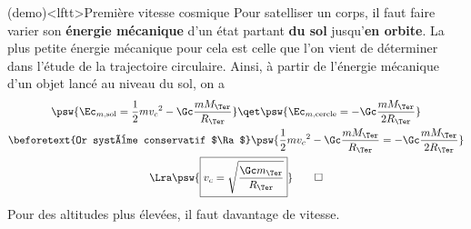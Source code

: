 \documentclass[../../main/main.tex]{subfiles}
\begin{document}
\begin{tcb*}(demo)<lftt>{Première vitesse cosmique}
  Pour satelliser un corps, il faut faire varier son \textbf{énergie mécanique}
  d'un état partant \textbf{du sol} jusqu'\textbf{en orbite}. La plus petite
  énergie mécanique pour cela est celle que l'on vient de déterminer dans
  l'étude de la trajectoire circulaire. Ainsi, à partir de l'énergie mécanique
  d'un objet lancé au niveau du sol, on a
	\begin{gather*}
    \psw{\Ec_{m,\rm sol} = \frac{1}{2}mv_c{}^2 -\Gc \frac{mM_\Ter}{R_\Ter}}
    \qet
		\psw{\Ec_{m,\rm cercle} = -\Gc \frac{mM_\Ter}{2R_\Ter}}
		\\
    \beforetext{Or système conservatif $\Ra$}
    \psw{
          \frac{1}{2}mv_c{}^2 -\Gc \frac{mM_\Ter}{R_\Ter} =
        -\Gc \frac{mM_\Ter}{2R_\Ter}
    }
		\\\Lra
    \psw{
      \boxed{v_c = \sqrt{\frac{\Gc m_\Ter}{R_\Ter}}}
    }
		\qed
	\end{gather*}
	Pour des altitudes plus élevées, il faut davantage de vitesse.
\end{tcb*}
\end{document}
